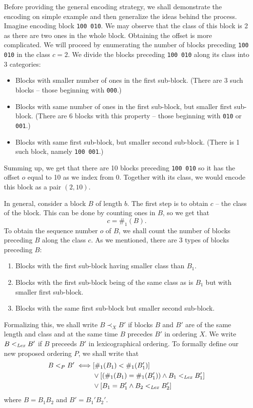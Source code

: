 Before providing the general encoding strategy, we shall demonstrate the encoding on
simple example and then generalize the ideas behind the process. Imagine encoding
block {\tt 100 010}. We may observe that the class of this block is 2 as there are two ones in
the whole block. Obtaining the offset is more complicated. We will proceed by enumerating the
number of blocks preceding {\tt 100 010} in the class $c=2$. We divide the blocks preceding
{\tt 100 010} along its class into 3 categories:

\begin{itemize}
    \item Blocks with smaller number of ones in the first sub-block.
    (There are 3 such blocks -- those beginning with {\tt 000}.)
    \item Blocks with same number of ones in the first sub-block, but smaller first sub-block.
    (There are 6 blocks with this property -- those beginning with {\tt 010} or {\tt 001}.)
    \item Blocks with same first sub-block, but smaller second sub-block.
    (There is 1 such block, namely {\tt 100 001}.)
\end{itemize}

Summing up, we get that there are 10 blocks preceding {\tt 100 010} so it has the offset $o$
equal to 10 as we index from 0. Together with its class, we would encode this block as a pair
$(2, 10)$.

In general, consider a block $B$ of length $b$. The first step is to obtain
$c$ -- the class of the block. This can be done by counting ones in $B$, so we
get that $$c=\#_1(B).$$ To obtain the sequence number $o$ of $B$, we shall
count the number of blocks preceding $B$ along the class $c$. As we mentioned,
there are 3 types of blocks preceding $B$:

\begin{enumerate}
    \item Blocks with the first sub-block having smaller class than $B_1$.
    \label{chapter3:encoding:1}
    \item Blocks with the first sub-block being of the same class as is $B_1$
    but with smaller first sub-block. \label{chapter3:encoding:2}
    \item Blocks with the same first sub-block but smaller second sub-block.
    \label{chapter3:encoding:3}
\end{enumerate}

Formalizing this, we shall write $B\prec_X B'$ if blocks $B$ and $B'$ are of
the same length and class and at the same time $B$ precedes $B'$ in ordering $X$.
We write $B<_{\mathit{Lex}} B'$ if $B$ preceeds $B'$ in lexicographical
ordering. To formally define our new proposed ordering $P$, we shall write that
\begin{align*}
    B<_P B' \iff
    &[\#_1(B_1) < \#_1(B_1')] \\
    &\lor [(\#_1(B_1) = \#_1(B_1')) \land B_1 <_{\mathit{Lex}} B_1']\\
    &\lor [B_1 = B_1' \land B_2 <_{\mathit{Lex}} B_2']
\end{align*}
where $B=B_1B_2$ and $B'=B_1'B_2'$.

